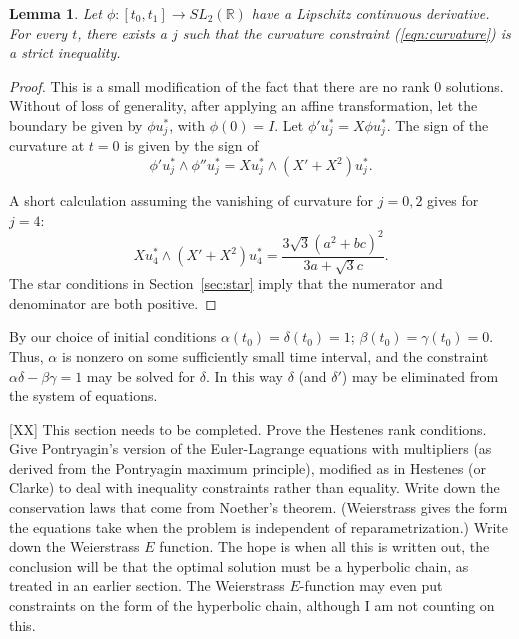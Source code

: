 \documentclass[11pt]{amsart}
\newtheorem{lemma}{Lemma}
\newcommand{\ring}[1]{\mathbb{#1}}
\begin{document}
\begin{lemma}  Let $\phi:[t_0,t_1]\to SL_2(\ring{R})$ have a Lipschitz
continuous derivative.  For every $t$, there exists a $j$ such that the curvature constraint (\ref{eqn:curvature}) is a strict inequality.
\end{lemma}

\begin{proof}  %
This is a small modification of the fact that there are no rank $0$ solutions.  Without of loss of generality, after applying an affine transformation, let the boundary be given by
$\phi u^*_j$, with $\phi(0)=I$.  Let $\phi' u^*_j = X\phi u^*_j$.
The sign of the curvature at $t=0$ is given by the sign of
$$
\phi' u^*_j \land \phi'' u^*_j = X u^*_j \land (X' + X^2) u^*_j.
$$

A short calculation
assuming the vanishing of curvature for $j=0,2$ gives for $j=4$:
$$
X u^*_4 \land (X' + X^2) u^*_4 = \frac{3\sqrt{3} (a^2 + b c)^2}{3 a + \sqrt{3} c}.
$$
The star conditions in Section~\ref{sec:star} imply that the numerator and denominator are both positive.

\end{proof}


By our choice of initial conditions $\alpha(t_0)=\delta(t_0)=1$; $\beta(t_0)=\gamma(t_0)=0$.  Thus, $\alpha$ is nonzero on some sufficiently small time
interval, and the constraint $\alpha\delta-\beta\gamma=1$ may be solved
for $\delta$.  In this way $\delta$ (and $\delta'$)
may be eliminated from the system of equations.

[XX] This section needs to be completed.  Prove the Hestenes rank conditions.  Give Pontryagin's version of the Euler-Lagrange equations with multipliers (as derived from the Pontryagin maximum principle), modified as in Hestenes (or Clarke) to deal with inequality constraints rather than equality.  Write down the conservation laws that come from Noether's theorem.  (Weierstrass gives the form the equations take when the problem is independent of reparametrization.) Write down the Weierstrass $E$ function.  The hope is when all this is written out, the conclusion will be that the optimal solution must be a hyperbolic chain, as treated in an earlier section. The Weierstrass $E$-function may even put constraints on the form of the hyperbolic chain, although I am not counting on this.
\end{document}
